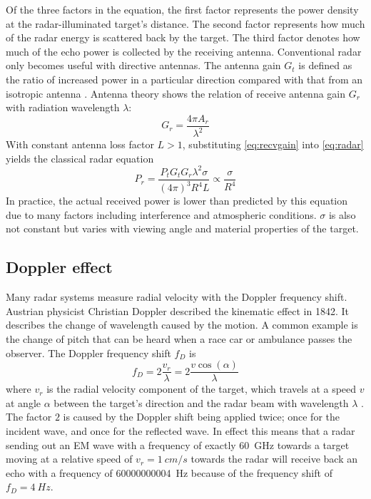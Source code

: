 Of the three factors in the equation, the first
factor represents the power density at the radar-illuminated target's
distance. The second factor represents how much of the radar energy is
scattered back by the target. The third factor denotes how much
of the echo power is collected by the receiving antenna.
\cite{Skolnik2008} Conventional radar only becomes useful with directive
antennas. The antenna gain \(G_t\) is defined as the ratio of increased
power in a particular direction compared with that from an isotropic
antenna \cite{Adams2012}. Antenna theory shows \cite{Balanis2015} the
relation of receive antenna gain \(G_r\) with radiation wavelength
\(\lambda\):
\begin{equation} \label{eq:recvgain}
    G_r = \frac{4\pi A_r}{\lambda^2}    
\end{equation}
With constant antenna loss factor \(L>1\), substituting \cref{eq:recvgain} into \cref{eq:radar}
yields the classical radar equation
\begin{equation} \label{eq:radarclassical}
    P_r =
    \frac{P_t G_t G_r \lambda^2 \sigma}{(4\pi)^3R^4L}
    \propto \frac{\sigma}{R^4}
\end{equation}
In practice, the actual received power is lower than predicted by
this equation due to many factors including interference and
atmospheric conditions. \(\sigma\) is also not constant but varies with
viewing angle and material properties of the target. \cite{Adams2012}

\subsection{Doppler effect}\label{doppler-effect}

Many radar systems measure radial velocity with the Doppler frequency
shift. Austrian physicist Christian Doppler described the kinematic
effect in 1842. It describes the change of wavelength caused by the
motion. A common example is the change of pitch that can be heard when a
race car or ambulance passes the observer. The Doppler frequency shift
\(f_D\) is
\begin{equation} \label{eq:doppler}
    f_D = 2 \frac{v_r}{\lambda} = 2 \frac{v \cos ( \alpha )}{\lambda}
\end{equation}
where \(v_r\) is the radial velocity component of the target, which
travels at a speed \(v\) at angle \(\alpha\) between the target's
direction and the radar beam with wavelength \(\lambda\)
\cite{Skolnik2008}. The factor \(2\) is caused by the Doppler shift
being applied twice; once for the incident wave, and once for the
reflected wave. In effect this means that a radar sending out an EM wave
with a frequency of exactly \SI{60}{GHz} towards a target moving at a
relative speed of \(v_r = \SI[per-mode=symbol]{1}{cm\per s}\) towards the radar will receive
back an echo with a frequency of \SI{60000000004}{Hz} because of the
frequency shift of \(f_D = \SI{4}{Hz}\).

